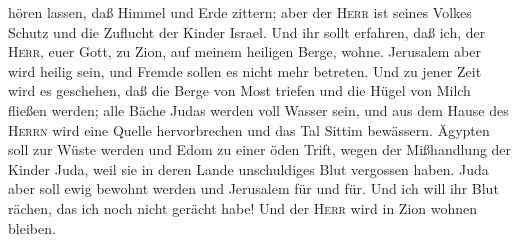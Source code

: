 hören lassen, daß Himmel und Erde zittern; aber der \textsc{Herr} ist
seines Volkes Schutz und die Zuflucht der Kinder Israel. 
Und ihr sollt erfahren, daß ich, der \textsc{Herr}, euer Gott, zu Zion,
auf meinem heiligen Berge, wohne. Jerusalem aber wird heilig sein, und
Fremde sollen es nicht mehr betreten.  Und zu jener Zeit
wird es geschehen, daß die Berge von Most triefen und die Hügel von
Milch fließen werden; alle Bäche Judas werden voll Wasser sein, und aus
dem Hause des \textsc{Herrn} wird eine Quelle hervorbrechen und das Tal
Sittim bewässern.  Ägypten soll zur Wüste werden und Edom
zu einer öden Trift, wegen der Mißhandlung der Kinder Juda, weil sie in
deren Lande unschuldiges Blut vergossen haben.  Juda aber
soll ewig bewohnt werden und Jerusalem für und für.  Und
ich will ihr Blut rächen, das ich noch nicht gerächt habe! Und der
\textsc{Herr} wird in Zion wohnen bleiben.
